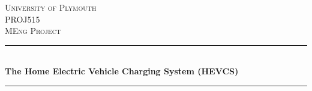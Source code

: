 \documentclass [12pt]{article}
\title{}
\author{}
\date{\today}
\begin{document}

\begin{titlepage} %
	\newcommand{\HRule}{\rule{\linewidth}{0.5mm}} %
	
	\center %
	
	
	\textsc{\LARGE University of Plymouth}\\[1.5cm] %
	
	\textsc{\Large PROJ515}\\[0.5cm] %
	
	\textsc{\large MEng Project}\\[0.5cm] %
	
	
	\HRule\\[0.4cm]
	
	{\huge\bfseries The Home Electric Vehicle Charging System (HEVCS)}\\[0.4cm] %
	
	\HRule\\[1.5cm]
	
	
	

\end{titlepage}
\end{document}
